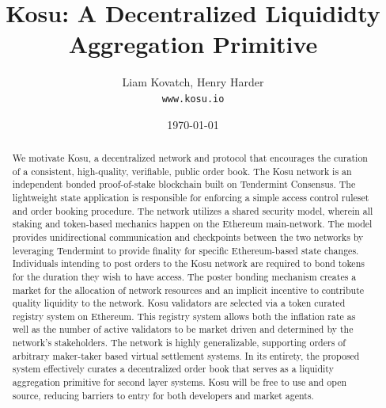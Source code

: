 \documentclass[10pt]{article}
\begin{document}

\title{\textbf{Kosu: A Decentralized Liquididty Aggregation Primitive}} 
\author{Liam Kovatch, Henry Harder \\\texttt{www.kosu.io}}
\date{\today}
\maketitle


\begin{abstract}
  \noindent We motivate Kosu, a decentralized network and protocol that encourages the curation of a consistent, high-quality, verifiable, public order book. The Kosu network is an independent bonded proof-of-stake blockchain built on Tendermint Consensus. The lightweight state application is responsible for enforcing a simple access control ruleset and order booking procedure. The network utilizes a shared security model, wherein all staking and token-based mechanics happen on the Ethereum main-network. The model provides unidirectional communication and checkpoints between the two networks by leveraging Tendermint to provide finality for specific Ethereum-based state changes. Individuals intending to post orders to the Kosu network are required to bond tokens for the duration they wish to have access. The poster bonding mechanism creates a market for the allocation of network resources and an implicit incentive to contribute quality liquidity to the network. Kosu validators are selected via a token curated registry system on Ethereum. This registry system allows both the inflation rate as well as the number of active validators to be market driven and determined by the network’s stakeholders. The network is highly generalizable, supporting orders of arbitrary maker-taker based virtual settlement systems. In its entirety, the proposed system effectively curates a decentralized order book that serves as a liquidity aggregation primitive for second layer systems. Kosu will be free to use and open source, reducing barriers to entry for both developers and market agents.
\end{abstract}
\pagebreak
\end{document}

